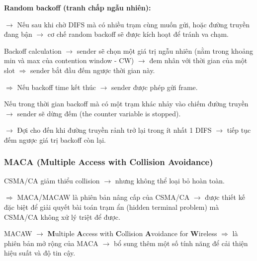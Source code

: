 \noindent
\textbf{Random backoff (tranh chấp ngẫu nhiên):}
\medskip

\noindent
$\rightarrow$ Nếu sau khi chờ DIFS mà có nhiều trạm cùng muốn gửi, hoặc đường truyền đang bận $\rightarrow$ cơ chế random backoff sẽ được kích hoạt để tránh va chạm.
\medskip

\noindent
Backoff calculation $\rightarrow$ sender sẽ chọn một giá trị ngẫu nhiên (nằm trong khoảng min và max của contention window - CW) $\rightarrow$ đem nhân với thời gian của một slot $\Rightarrow$ sender bắt đầu đếm ngược thời gian này.

$\Rightarrow$ Nếu backoff time kết thúc $\rightarrow$ sender được phép gửi frame.
\medskip

\noindent
Nếu trong thời gian backoff mà có một trạm khác nhảy vào chiếm đường truyền $\rightarrow$ sender sẽ dừng đếm (the counter variable is stopped).

$\rightarrow$ Đợi cho đến khi đường truyền rảnh trở lại trong ít nhất 1 DIFS $\rightarrow$ tiếp tục đếm ngược giá trị backoff còn lại.
\medskip

\noindent
{}

\subsubsection{MACA (Multiple Access with Collision Avoidance)}

\noindent
CSMA/CA giảm thiểu collision $\rightarrow$ nhưng không thể loại bỏ hoàn toàn.

$\Rightarrow$ MACA/MACAW là phiên bản nâng cấp của CSMA/CA $\rightarrow$ được thiết kế đặc biệt để giải quyết bài toán trạm ẩn (hidden terminal problem) mà CSMA/CA không xử lý triệt để được.
\medskip

\noindent
MACAW $\rightarrow$ \textbf{M}ultiple \textbf{A}ccess with \textbf{C}ollision \textbf{A}voidance for \textbf{W}ireless $\Rightarrow$ là phiên bản mở rộng của MACA $\rightarrow$ bổ sung thêm một số tính năng để cải thiện hiệu suất và độ tin cậy.
\medskip

